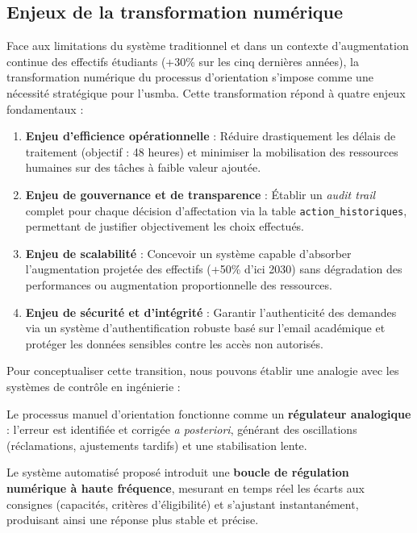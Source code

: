\documentclass[french,12pt]{report} %
\begin{document}
\subsection{Enjeux de la transformation numérique}

Face aux limitations du système traditionnel et dans un contexte d'augmentation continue des effectifs étudiants (+30\% sur les cinq dernières années), la transformation numérique du processus d'orientation s'impose comme une nécessité stratégique pour l'\gls{usmba}. Cette transformation répond à quatre enjeux fondamentaux :

\begin{enumerate}
    \item \textbf{Enjeu d'efficience opérationnelle} : Réduire drastiquement les délais de traitement (objectif : 48 heures) et minimiser la mobilisation des ressources humaines sur des tâches à faible valeur ajoutée.
    
    \item \textbf{Enjeu de gouvernance et de transparence} : Établir un \textit{audit trail} complet pour chaque décision d'affectation via la table \texttt{action\_historiques}, permettant de justifier objectivement les choix effectués.
    
    \item \textbf{Enjeu de scalabilité} : Concevoir un système capable d'absorber l'augmentation projetée des effectifs (+50\% d'ici 2030) sans dégradation des performances ou augmentation proportionnelle des ressources.
    
    \item \textbf{Enjeu de sécurité et d'intégrité} : Garantir l'authenticité des demandes via un système d'authentification robuste basé sur l'email académique et protéger les données sensibles contre les accès non autorisés.
\end{enumerate}

Pour conceptualiser cette transition, nous pouvons établir une analogie avec les systèmes de contrôle en ingénierie :

\begin{definitionbox}
Le processus manuel d'orientation fonctionne comme un \textbf{régulateur analogique} : l'erreur est identifiée et corrigée \textit{a posteriori}, générant des oscillations (réclamations, ajustements tardifs) et une stabilisation lente.

Le système automatisé proposé introduit une \textbf{boucle de régulation numérique à haute fréquence}, mesurant en temps réel les écarts aux consignes (capacités, critères d'éligibilité) et s'ajustant instantanément, produisant ainsi une réponse plus stable et précise.
\end{definitionbox}
\end{document}
